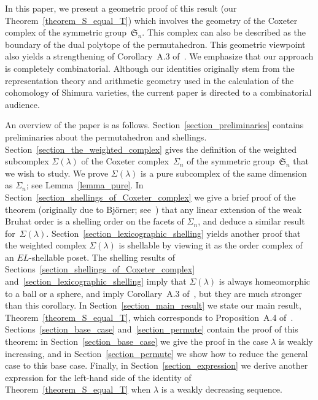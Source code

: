 \documentclass[ALCO,ThmDefs,Unicode,epreuves]{cedram}
\newcommand{\Sym}{\mathfrak{S}}
\begin{document}
In this paper, we present a
geometric proof of this result (our Theorem~\ref{theorem_S_equal_T})
which involves the geometry of the
Coxeter complex of the symmetric group~$\Sym_{n}$.
This complex can also be described as the boundary
of the dual polytope of the permutahedron.
This geometric viewpoint also yields
a strengthening of Corollary~A.3 of~\cite{Morel}.
We emphasize that our approach is completely combinatorial.
Although our identities 
originally stem from the representation theory and 
arithmetic geometry used in the calculation 
of the cohomology of Shimura varieties,
the current paper is directed to a combinatorial audience.





An overview of the paper is as follows.
Section~\ref{section_preliminaries}
contains preliminaries
about the permutahedron
and shellings.
Section~\ref{section_the_weighted_complex}
gives the definition of the weighted subcomplex $\Sigma(\lambda)$ of
the Coxeter complex~$\Sigma_{n}$ of the symmetric group~$\Sym_n$
that we
wish to study.  We prove $\Sigma(\lambda)$ is a pure 
subcomplex of the same
dimension as $\Sigma_{n}$;
see Lemma~\ref{lemma_pure}.
In
Section~\ref{section_shellings_of_Coxeter_complex}
we give a brief proof of the theorem (originally
due to Bj\"orner; see~\cite{Bjorner_II}) 
that any linear extension of the weak Bruhat order is
a shelling order on the facets of $\Sigma_{n}$, 
and deduce a similar result
for~$\Sigma(\lambda)$.
Section~\ref{section_lexicographic_shelling}
yields another proof that
the weighted complex $\Sigma(\lambda)$ is shellable
by viewing it as the order complex of an
$EL$-shellable poset.
The shelling results of
Sections~\ref{section_shellings_of_Coxeter_complex}
and~\ref{section_lexicographic_shelling}
imply that
$\Sigma(\lambda)$ is always homeomorphic to a ball or a sphere, and imply
Corollary~A.3 of~\cite{Morel}, but they are much stronger than this
corollary.
In Section~\ref{section_main_result}
we state our main result, Theorem~\ref{theorem_S_equal_T},
which corresponds to Proposition~A.4 of~\cite{Morel}.
Sections~\ref{section_base_case}
and~\ref{section_permute}
contain the proof of this theorem:
in Section~\ref{section_base_case}
we give the proof in the case
$\lambda$ is weakly increasing,
and in
Section~\ref{section_permute}
we show how to reduce the general case
to this base case. Finally,
in Section~\ref{section_expression}
we derive another expression for the left-hand side of the identity of
Theorem~\ref{theorem_S_equal_T}
when $\lambda$ is a weakly decreasing sequence.
\end{document}
